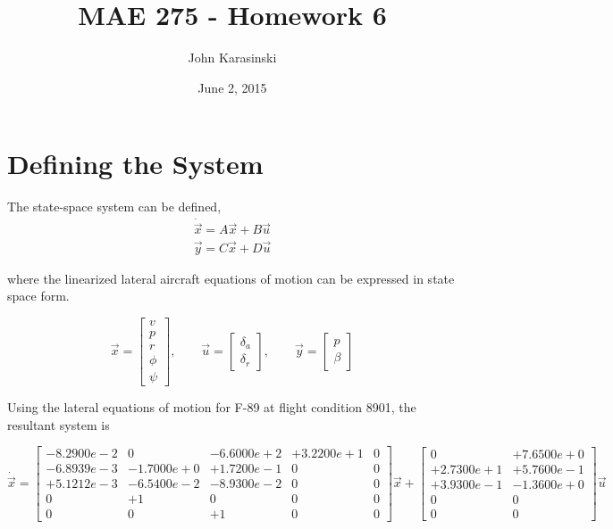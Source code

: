 \documentclass[11pt]{article}
\title{MAE 275 - Homework 6}
\author{John Karasinski}
\date{June 2, 2015}
\begin{document}
\maketitle

\section{Defining the System}
The state-space system can be defined,
\begin{equation*}
\begin{split}
\dot{\vec{x}} = A\vec{x} + B\vec{u} \\
      \vec{y} = C\vec{x} + D\vec{u}
\end{split}
\end{equation*}

\noindent where the linearized lateral aircraft equations of motion can be expressed in state space form.

$$
\vec{x}= \left[ \begin{array}{c}        v \\ p        \\ r   \\ \phi \\   \psi \end{array} \right], \qquad
\vec{u}= \left[ \begin{array}{c} \delta_a \\ \delta_r                          \end{array} \right], \qquad
\vec{y}= \left[ \begin{array}{c}        p \\ \beta                             \end{array} \right]
$$

\noindent Using the lateral equations of motion for F-89 at flight condition 8901, the resultant system is

$$
\dot{\vec{x}} = \left[ \begin{array}{ccccc}
  -8.2900e-2 &          0 & -6.6000e+2 & +3.2200e+1 &          0 \\
  -6.8939e-3 & -1.7000e+0 & +1.7200e-1 &          0 &          0 \\
  +5.1212e-3 & -6.5400e-2 & -8.9300e-2 &          0 &          0 \\
           0 &         +1 &          0 &          0 &          0 \\
           0 &          0 &         +1 &          0 &          0 \end{array} \right]
\vec{x} + \left[\begin{array}{ccc}
           0 & +7.6500e+0 \\
  +2.7300e+1 & +5.7600e-1 \\
  +3.9300e-1 & -1.3600e+0 \\
           0 &          0 \\
           0 &          0 \end{array}\right] \vec{u}
$$
\end{document}
